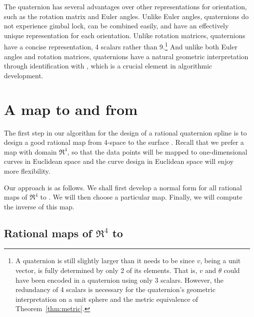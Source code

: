 The quaternion has several advantages over other representations
for orientation, such as the rotation matrix and Euler angles.
Unlike Euler angles, quaternions do not experience gimbal lock,
can be combined easily, and have an effectively unique representation
for each orientation.
Unlike rotation matrices, quaternions have a concise representation,
4 scalars rather than 9.\footnote{A quaternion is still slightly 
	larger than it needs to be since $v$, being a unit vector, 
	is fully determined by only 2 of its elements.
	That is, $v$ and $\theta$ could have been encoded in 
	a quaternion using only 3 scalars.
	However, the redundancy of 4 scalars is necessary for
	the quaternion's geometric interpretation on a unit sphere 
	and the metric equivalence of Theorem~\ref{thm:metric}.}
And unlike both Euler angles and rotation matrices, 
quaternions have a natural geometric interpretation through identification
with , which is a crucial element in algorithmic development.

\section{A map to and from }
\label{sec:map}

The first step in our algorithm for the design of a rational quaternion
spline is to design a good rational map from 4-space to the surface .
Recall that we prefer a map with domain $\Re^4$, so that the data points will be
mapped to one-dimensional curves in Euclidean space and the 
curve design in Euclidean space will enjoy more flexibility.

Our approach is as follows.
We shall first develop a normal form for all rational maps of $\Re^4$ to .
We will then choose a particular map.
Finally, we will compute the inverse of this map.

\subsection{Rational maps of $\Re^4$ to }

